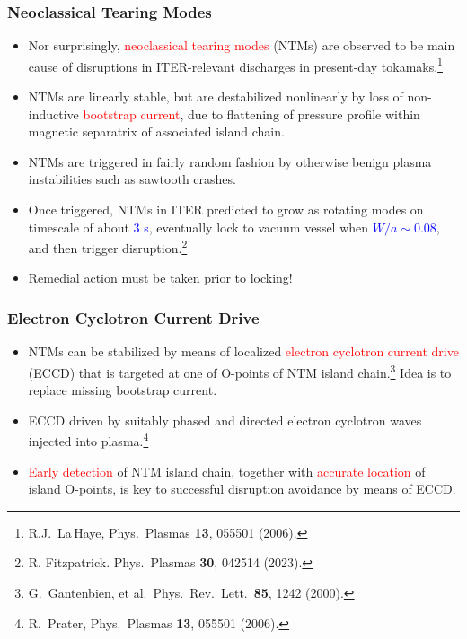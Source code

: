 \documentclass{beamer}
\begin{document}
\begin{frame}
\frametitle{Neoclassical Tearing Modes}
 
\begin{itemize}
\item Nor surprisingly, \textcolor{red}{neoclassical tearing modes} (NTMs) are observed to be main cause of disruptions in ITER-relevant discharges in present-day 
tokamaks.\footnote{R.J.~La\,Haye, Phys.\ Plasmas {\bf 13}, 055501 (2006).} 
\item NTMs are linearly stable, but are destabilized nonlinearly by loss of non-inductive \textcolor{red}{bootstrap current}, due to flattening of pressure profile within magnetic separatrix of
associated island chain.

\item NTMs are triggered in fairly random fashion by otherwise benign plasma instabilities such as sawtooth crashes. 
\item Once triggered, NTMs in ITER predicted to  grow as rotating modes on timescale of about \textcolor{blue}{3 s}, eventually lock to vacuum vessel when \textcolor{blue}{$W/a\sim 0.08$}, and then trigger disruption.\footnote{R. Fitzpatrick. Phys.\ Plasmas {\bf 30}, 042514 (2023).} 

\item Remedial action must be taken prior to locking!
\end{itemize}
\end{frame}

\begin{frame}
\frametitle{Electron Cyclotron Current Drive}
 
\begin{itemize}
\item NTMs can be stabilized by means of localized \textcolor{red}{electron cyclotron current drive} (ECCD) that is targeted at one of  O-points of  NTM
island chain.\footnote{G.~Gantenbien, et al.\ Phys.\ Rev.\ Lett.\ {\bf 85}, 1242 (2000).} Idea is to replace missing bootstrap current.

\item ECCD driven by suitably phased and directed electron cyclotron waves injected into plasma.\footnote{R.~Prater, Phys.\ Plasmas {\bf 13}, 055501 (2006).}

\item \textcolor{red}{Early detection} of NTM island chain, together with \textcolor{red}{accurate location} of island O-points,  is key to successful disruption avoidance by means of ECCD. 
\end{itemize}
\end{frame}
\end{document}
